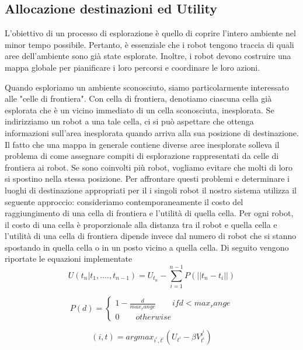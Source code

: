 \subsection{Allocazione destinazioni ed Utility}
L'obiettivo di un processo di esplorazione è quello di coprire l'intero ambiente nel minor tempo possibile. Pertanto, è essenziale che i robot tengono traccia di quali aree dell'ambiente sono già state esplorate. Inoltre, i robot devono costruire una mappa globale per pianificare i loro percorsi e coordinare le loro azioni.

Quando esploriamo un ambiente sconosciuto, siamo particolarmente interessato alle "celle di frontiera". 
Con cella di frontiera, denotiamo ciascuna cella già esplorata che è un vicino immediato di un cella sconosciuta, inesplorata. 
Se indirizziamo un robot a una tale cella, ci si può aspettare che ottenga informazioni sull'area inesplorata
quando arriva alla sua posizione di destinazione.
Il fatto che una mappa in generale contiene diverse aree inesplorate solleva il problema di come assegnare compiti di esplorazione rappresentati da celle di frontiera ai robot.
Se sono coinvolti più robot, vogliamo evitare che molti di loro si spostino nella stessa posizione. Per affrontare questi problemi e determinare i luoghi di destinazione appropriati per il i singoli robot il nostro sistema utilizza il seguente approccio: consideriamo contemporaneamente il costo del raggiungimento di una cella di frontiera e l'utilità di quella cella.
Per ogni robot, il costo di una cella è proporzionale alla distanza tra il robot e quella cella e l'utilità di una cella di frontiera dipende invece dal numero di robot che si stanno spostando in quella cella o in un posto vicino a quella cella.
Di seguito vengono riportate le equazioni implementate
\begin{equation}	
\label{eq:componet}
U(t_n|t_1,....,t_{n-1} ) = U_{t_n} -  \sum_{i=1}^{n-1} P(||t_n - t_i ||)
\end{equation}

\begin{equation}	
\label{eq:componet}
P(d) = \begin{cases} 
   1 - \frac{d}{max_range}   \quad \quad if d < max_range \\  0 \quad \quad otherwise
   \end{cases}
\end{equation}

\begin{equation}	
\label{eq:componet}
(i,t) = argmax_{i^{\iota},t^{\iota}} (U_{t^{\iota}}  -\beta V^{i^{\iota}}_{t^{\iota}} ) 
\end{equation}

